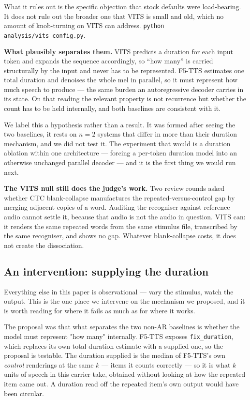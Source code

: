 \documentclass[11pt]{article}
\begin{document}
What it rules out is the specific objection that stock defaults were
load-bearing. It does not rule out the broader one that VITS is small and old,
which no amount of knob-turning on VITS can address.
\texttt{python analysis/vits\_config.py}.

\noindent\textbf{What plausibly separates them.} VITS predicts a duration for
each input token and expands the sequence accordingly, so ``how many'' is carried
structurally by the input and never has to be represented. F5-TTS estimates one
total duration and denoises the whole mel in parallel, so it must represent how
much speech to produce --- the same burden an autoregressive decoder carries in
its state. On that reading the relevant property is not recurrence but whether
the count has to be held internally, and both baselines are consistent with it.

We label this a hypothesis rather than a result. It was formed after seeing the
two baselines, it rests on $n=2$ systems that differ in more than their duration
mechanism, and we did not test it. The experiment that would is a duration
ablation within one architecture --- forcing a per-token duration model into an
otherwise unchanged parallel decoder --- and it is the first thing we would run
next.

\noindent\textbf{The VITS null still does the judge's work.} Two review rounds
asked whether CTC blank-collapse manufactures the repeated-versus-control gap by
merging adjacent copies of a word. Auditing the recogniser against reference
audio cannot settle it, because that audio is not the audio in question. VITS
can: it renders the same repeated words from the same stimulus file, transcribed
by the same recogniser, and shows no gap. Whatever blank-collapse costs, it does
not create the dissociation.

\subsection{An intervention: supplying the duration}
\label{sec:s13-dur}

Everything else in this paper is observational --- vary the stimulus, watch the
output. This is the one place we intervene on the mechanism we proposed, and it
is worth reading for where it fails as much as for where it works.

The proposal was that what separates the two non-AR baselines is whether the
model must represent "how many" internally. F5-TTS exposes \texttt{fix\_duration}, which
replaces its own total-duration estimate with a supplied one, so the proposal is
testable. The duration supplied is the median of F5-TTS's own \emph{control}
renderings at the same $k$ --- items it counts correctly --- so it is what $k$
units of speech in this carrier take, obtained without looking at how the
repeated item came out. A duration read off the repeated item's own output would
have been circular.
\end{document}
